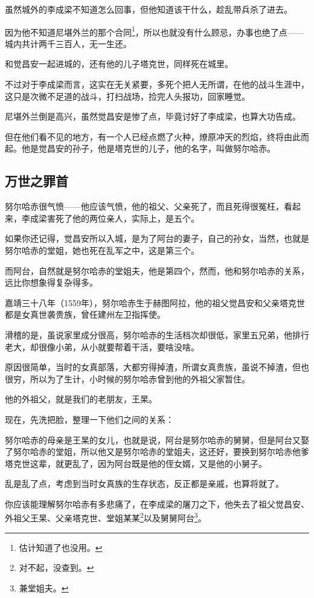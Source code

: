 \begin{multicols}{\theparacolNo}
虽然城外的李成梁不知道怎么回事，但他知道该干什么，趁乱带兵杀了进去。

因为他不知道尼堪外兰的那个合同\footnote{估计知道了也没用。}，所以也就没有什么顾忌，办事也绝了点——城内共计两千三百人，无一生还。

和觉昌安一起进城的，还有他的儿子塔克世，同样死在城里。

不过对于李成梁而言，这实在无关紧要，多死个把人无所谓，在他的战斗生涯中，这只是次微不足道的战斗，打扫战场，捡完人头报功，回家睡觉。

尼堪外兰倒是高兴，虽然觉昌安是惨了点，毕竟讨好了李成梁，也算大功告成。

但在他们看不见的地方，有一个人已经点燃了火种，燎原冲天的烈焰，终将由此而起。他是觉昌安的孙子，他是塔克世的儿子，他的名字，叫做努尔哈赤。

\subsection{万世之罪首}
努尔哈赤很气愤——他应该气愤，他的祖父、父亲死了，而且死得很冤枉，看起来，李成梁害死了他的两位亲人，实际上，是五个。

如果你还记得，觉昌安所以入城，是为了阿台的妻子，自己的孙女，当然，也就是努尔哈赤的堂姐，她也死在乱军之中，这是第三个。

而阿台，自然就是努尔哈赤的堂姐夫，他是第四个，然而，他和努尔哈赤的关系，远比你想象得复杂得多。

嘉靖三十八年（1559年），努尔哈赤生于赫图阿拉，他的祖父觉昌安和父亲塔克世都是女真世袭贵族，曾任建州左卫指挥使。

滑稽的是，虽说家里成分很高，努尔哈赤的生活档次却很低，家里五兄弟，他排行老大，却很像小弟，从小就要帮着干活，要啥没啥。

原因很简单，当时的女真部落，大都穷得掉渣，所谓女真贵族，虽说不掉渣，但也很穷，所以为了生计，小时候的努尔哈赤曾到他的外祖父家暂住。

他的外祖父，就是我们的老朋友，王杲。

现在，先洗把脸，整理一下他们之间的关系：

努尔哈赤的母亲是王杲的女儿，也就是说，阿台是努尔哈赤的舅舅，但是阿台又娶了努尔哈赤的堂姐，所以他又是努尔哈赤的堂姐夫，这还好，要换到努尔哈赤他爹塔克世这辈，就更乱了，因为阿台既是他的侄女婿，又是他的小舅子。

乱是乱了点，考虑到当时女真族的生存状态，反正都是亲戚，也算将就了。

你应该能理解努尔哈赤有多悲痛了，在李成梁的屠刀之下，他失去了祖父觉昌安、外祖父王杲、父亲塔克世、堂姐某某\footnote{对不起，没查到。}以及舅舅阿台\footnote{兼堂姐夫。}。


\end{multicols}
